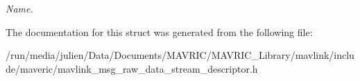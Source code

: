 \begin{DoxyCompactItemize}
\begin{DoxyCompactList}\small\item\em Name. \end{DoxyCompactList}\end{DoxyCompactItemize}


The documentation for this struct was generated from the following file\+:\begin{DoxyCompactItemize}
\item 
/run/media/julien/\+Data/\+Documents/\+M\+A\+V\+R\+I\+C/\+M\+A\+V\+R\+I\+C\+\_\+\+Library/mavlink/include/maveric/mavlink\+\_\+msg\+\_\+raw\+\_\+data\+\_\+stream\+\_\+descriptor.\+h\end{DoxyCompactItemize}
